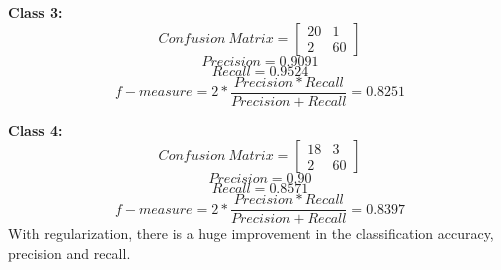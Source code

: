 \documentclass[12pt]{article}
\begin{document}
\textbf{Class 3:}
\begin{equation}
Confusion\ Matrix = \begin{bmatrix} 20  & 1 \\ 2 & 60 \end{bmatrix}
\end{equation}
\begin{equation}
Precision = 0.9091
\end{equation}
\begin{equation}
Recall = 0.9524
\end{equation}
\begin{equation}
f-measure = 2*\frac{Precision*Recall}{Precision + Recall} = 0.8251
\end{equation}


\textbf{Class 4:}
\begin{equation}
Confusion\ Matrix = \begin{bmatrix} 18  & 3 \\ 2 & 60 \end{bmatrix}
\end{equation}
\begin{equation}
Precision = 0.90
\end{equation}
\begin{equation}
Recall = 0.8571
\end{equation}
\begin{equation}
f-measure = 2*\frac{Precision*Recall}{Precision + Recall} = 0.8397
\end{equation}
With regularization, there is a huge improvement in the classification accuracy, precision and recall.



 
\end{document}
